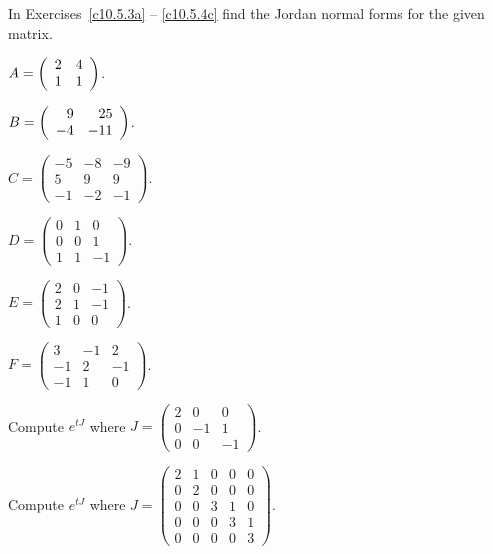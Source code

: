 \documentclass{ximera}
\begin{document}
\noindent In Exercises~\ref{c10.5.3a} -- \ref{c10.5.4c} find the 
Jordan normal forms for the given matrix.
\begin{exercise} \label{c10.5.3a}
$A = \left(\begin{array}{rr} 2 & 4\\ 1 &1\end{array}\right)$. 
\end{exercise}
\begin{exercise} \label{c10.5.3b}
$B = \left(\begin{array}{rr} 9 & 25\\ -4 &-11\end{array}\right)$.
\end{exercise}
\begin{exercise} \label{c10.5.4}
$C = \left(\begin{array}{rrr} -5 & -8 & -9 \\  5 & 9 & 9 \\
 -1 & -2 & -1 \end{array}\right)$.
\end{exercise}
\begin{exercise} \label{c10.5.4a}
$D = \left(\begin{array}{rrr} 0 & 1 & 0 \\  0 & 0 & 1 \\
1 & 1 & -1 \end{array}\right)$.
\end{exercise}
\begin{exercise} \label{c10.5.4b}
$E = \left(\begin{array}{rrr} 2 & 0 & -1 \\  2 & 1 & -1 \\
1 & 0 & 0 \end{array}\right)$.
\end{exercise}
\begin{exercise} \label{c10.5.4c}
$F = \left(\begin{array}{rrr} 3 & -1 & 2 \\  -1 & 2 & -1 \\
-1 & 1 & 0 \end{array}\right)$.
\end{exercise}

\begin{exercise}  \label{c10.5.5A}
Compute $e^{tJ}$ where $J=\left(\begin{array}{rrr} 2 & 0 & 0 \\  0 & -1 & 1 \\
0 & 0 & -1 \end{array}\right)$.
\end{exercise}

\begin{exercise}  \label{c10.5.5B}
Compute $e^{tJ}$ where $J=\left(\begin{array}{rrrrr} 2 & 1 & 0 & 0 & 0\\  
0 & 2 & 0 & 0 & 0 \\ 0 & 0 & 3 & 1 & 0\\ 0 & 0 & 0 & 3 & 1\\
0 & 0 & 0 & 0 & 3 \end{array}\right)$.
\end{exercise}
\end{document}
